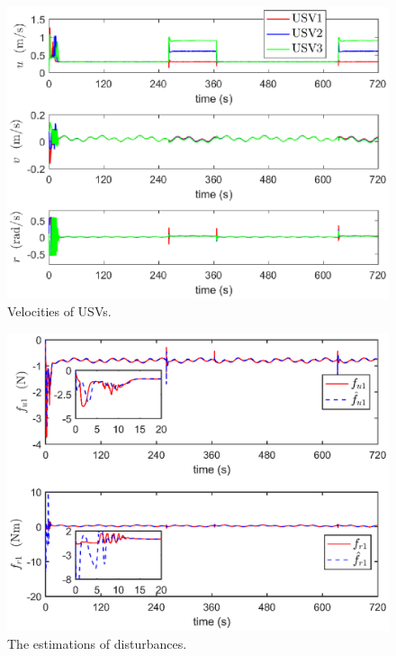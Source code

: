 \documentclass[conference,letterpaper,10.5pt]{IEEEtran}
\begin{document}
\begin{figure}[!htb]
	\centering
	\includegraphics[width=\hsize]{velocities.eps}
	\caption{Velocities of USVs.}
	\label{velocities}
\end{figure}

\begin{figure}[!htb]
	\centering
	\includegraphics[width=\hsize]{RBFNN.eps}
	\caption{The estimations of disturbances.}
	\label{rbfnn}
\end{figure}
\end{document}
